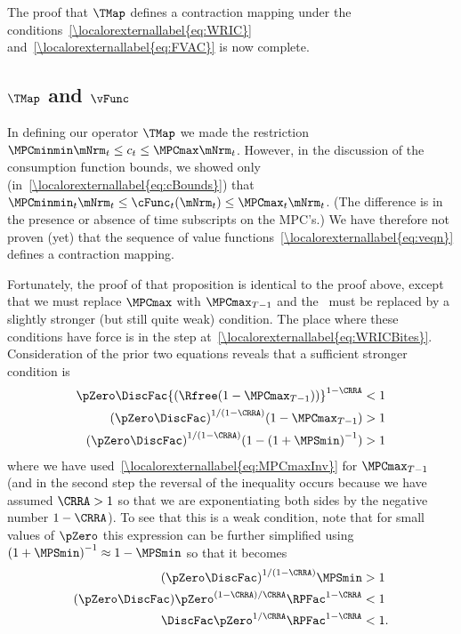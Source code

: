 \documentclass[\econtexRoot/BufferStockTheory]{subfiles}
\begin{document}
The proof that $\TMap$ defines a contraction mapping under the
conditions~\eqref{\localorexternallabel{eq:WRIC}} and~\eqref{\localorexternallabel{eq:FVAC}} is
now complete.

\subsection{
  \texorpdfstring{$\TMap$}{T} and \texorpdfstring{$\vFunc$}{v}}

In defining our operator $\TMap$ we made the restriction
$\MPCminmin \mNrm_{t} \leq c_{t} \leq \MPCmax \mNrm_{t}$.  However,
in the discussion of the consumption function bounds, we
showed only (in~\eqref{\localorexternallabel{eq:cBounds}}) that $\MPCminmin_{t} \mNrm_{t} \leq \cFunc_{t}(\mNrm_{t})
\leq \MPCmax_{t} \mNrm_{t}$.  (The difference is in the presence
or absence of time subscripts on the MPC's.)
We have therefore
not proven (yet) that the sequence of value functions~\eqref{\localorexternallabel{eq:veqn}} defines a contraction mapping.

Fortunately, the proof of that proposition is identical to the proof above, except that we must replace
$\MPCmax$ with $\MPCmax_{T-1}$ and the \WRIC~must be
replaced by a slightly stronger (but still quite weak) condition.  The place where these
conditions have force is in the step at~\eqref{\localorexternallabel{eq:WRICBites}}.
Consideration of the prior two equations reveals that
a sufficient stronger condition is
\begin{align*}
  \pZero \DiscFac {(\Rfree (1-\MPCmax_{T-1}))}^{1-\CRRA}  & < 1
  \\  {(\pZero \DiscFac)}^{1/(1-\CRRA)}  (1-\MPCmax_{T-1})  & > 1
  \\  {(\pZero \DiscFac)}^{1/(1-\CRRA)}  (1-{(1+\MPSmin)}^{-1})  & > 1
\end{align*}
where we have used~\eqref{\localorexternallabel{eq:MPCmaxInv}} for $\MPCmax_{T-1}$ (and in the second step the reversal of the inequality occurs because we have assumed $\CRRA > 1$ so that we are exponentiating both sides by the negative number $1-\CRRA$).  To see that this is a weak condition, note that for small values of
$\pZero$ this expression can be further simplified using ${(1+\MPSmin)}^{-1}
\approx 1-\MPSmin$ so that it becomes
\begin{align*}
  {(\pZero \DiscFac)}^{1/(1-\CRRA)}  \MPSmin  & > 1
  \\  (\pZero \DiscFac)  \pZero^{(1-\CRRA)/\CRRA} \RPFac^{1-\CRRA}  & < 1
  \\  \DiscFac  \pZero^{1/\CRRA} \RPFac^{1-\CRRA}  & < 1.
\end{align*}
\end{document}
